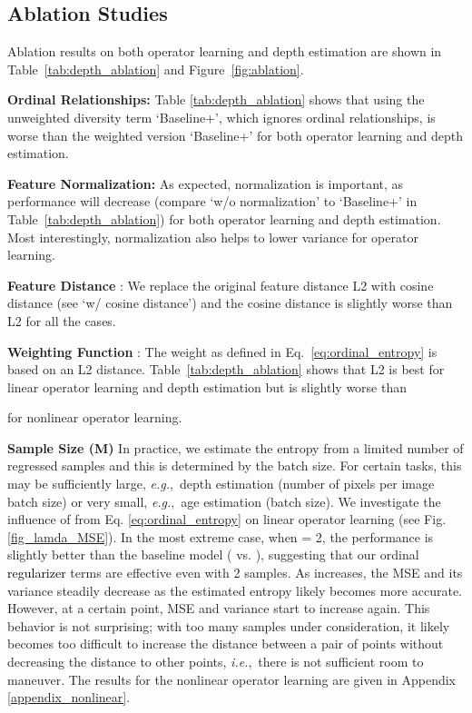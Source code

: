 \documentclass{article} \usepackage{iclr2023_conference,times}
\makeatletter
\newcommand*{\eg}{e.g.\@\xspace}
\newcommand*{\ie}{i.e.\@\xspace}
\def\ie{\mbox{\textit{i.e.}, }}
\def\eg{\mbox{\textit{e.g.}, }}
\def\shihao{\textcolor{black}}
\makeatother
\begin{document}
\subsection{Ablation Studies}
Ablation results on both operator learning and depth estimation are shown in Table~\ref{tab:depth_ablation} and Figure~\ref{fig:ablation}. 

\textbf{Ordinal Relationships:} Table \ref{tab:depth_ablation} shows that using the unweighted diversity term `Baseline+', which ignores ordinal relationships, is worse than the weighted version `Baseline+' for both operator learning and depth estimation. 


\textbf{Feature Normalization:} As expected, normalization is important, as performance will decrease (compare `w/o normalization' to `Baseline+' in Table~\ref{tab:depth_ablation}) for both operator learning and depth estimation.  Most interestingly, normalization also helps to lower variance for operator learning. 

\textbf{Feature Distance} : We replace the original feature distance L2 with cosine distance (see `w/ cosine distance') and the cosine distance is slightly worse than L2 for all the cases.

\textbf{Weighting Function} : The weight as defined in Eq.~\ref{eq:ordinal_entropy} is based on an L2 distance. Table~\ref{tab:depth_ablation} shows that L2 is best for linear operator learning and depth estimation but is slightly worse than 

for nonlinear operator learning.


\textbf{Sample Size (M)}
In practice, we estimate the entropy from a limited number of regressed samples and this is determined by the batch size. For certain tasks, this may be sufficiently large, \eg depth estimation (number of pixels per image  batch size) or very small, \eg age estimation (batch size).  We investigate the influence of  from Eq. \ref{eq:ordinal_entropy} on linear operator learning (see Fig.\ref{fig_lamda_MSE}).
In the most extreme case, when  = 2, the performance is slightly better than the baseline model ( vs. ), suggesting that our ordinal \shihao{regularizer} terms are effective even with 2 samples. 
As  increases, the MSE and its variance steadily decrease as the estimated entropy likely becomes more accurate.  However, at a certain point, MSE and variance start to increase again. This behavior is not surprising; with too many samples under consideration, it likely becomes too difficult to increase the distance between a pair of points without decreasing the distance to other points, \ie there is not sufficient room to maneuver. 
The results for the nonlinear operator learning are given in Appendix \ref{appendix_nonlinear}.
\end{document}
